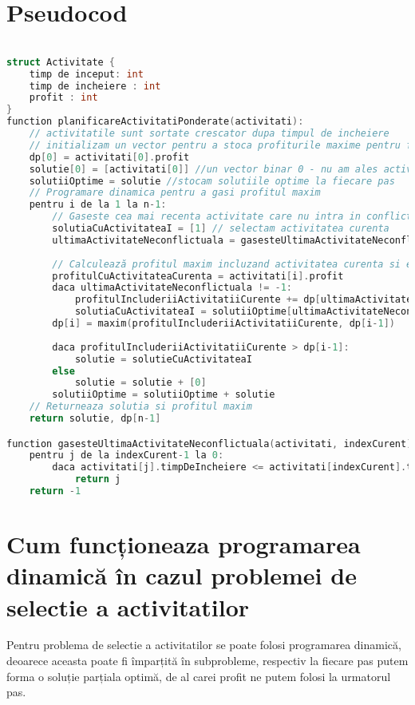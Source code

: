 \section{Pseudocod}
\begin{lstlisting}[language=C++]

struct Activitate {
    timp de inceput: int
    timp de incheiere : int
    profit : int 
}
function planificareActivitatiPonderate(activitati):
    // activitatile sunt sortate crescator dupa timpul de incheiere
    // initializam un vector pentru a stoca profiturile maxime pentru fiecare activitate, fie dp un vector de dimensiune n, unde n este numarul de activitati
    dp[0] = activitati[0].profit
    solutie[0] = [activitati[0]] //un vector binar 0 - nu am ales activitatea si 1 - am ales activitatea
    solutiiOptime = solutie //stocam solutiile optime la fiecare pas
    // Programare dinamica pentru a gasi profitul maxim
    pentru i de la 1 la n-1:
        // Gaseste cea mai recenta activitate care nu intra in conflict cu activitatea curenta
        solutiaCuActivitateaI = [1] // selectam activitatea curenta
        ultimaActivitateNeconflictuala = gasesteUltimaActivitateNeconflictuala(activitati, i)
        
        // Calculează profitul maxim incluzand activitatea curenta si excluzand-o
        profitulCuActivitateaCurenta = activitati[i].profit
        daca ultimaActivitateNeconflictuala != -1:
            profitulIncluderiiActivitatiiCurente += dp[ultimaActivitateNeconflictuala]
            solutiaCuActivitateaI = solutiiOptime[ultimaActivitateNeconflictuala] + solutiaCuActivitateaI
        dp[i] = maxim(profitulIncluderiiActivitatiiCurente, dp[i-1])
        
        daca profitulIncluderiiActivitatiiCurente > dp[i-1]:
            solutie = solutieCuActivitateaI
        else
            solutie = solutie + [0]
        solutiiOptime = solutiiOptime + solutie 
    // Returneaza solutia si profitul maxim
    return solutie, dp[n-1]

function gasesteUltimaActivitateNeconflictuala(activitati, indexCurent):
    pentru j de la indexCurent-1 la 0:
        daca activitati[j].timpDeIncheiere <= activitati[indexCurent].timpDeInceput:
            return j
    return -1
\end{lstlisting}

\section{Cum funcționeaza programarea dinamică în cazul problemei de selectie a activitatilor}
Pentru problema de selectie a activitatilor se poate folosi programarea dinamică, deoarece aceasta poate fi împarțită în subprobleme, respectiv la fiecare pas putem forma o soluție parțiala optimă, de al carei profit ne putem folosi la urmatorul pas. \\


